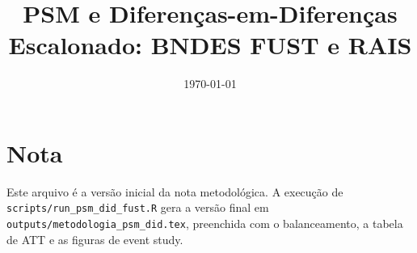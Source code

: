 \documentclass[12pt]{article}
\title{PSM e Diferenças-em-Diferenças Escalonado: BNDES FUST e RAIS}
\author{}
\date{\today}
\begin{document}
\maketitle

\section{Nota}

Este arquivo é a versão inicial da nota metodológica. A execução de
\texttt{scripts/run\_psm\_did\_fust.R} gera a versão final em
\texttt{outputs/metodologia\_psm\_did.tex}, preenchida com o balanceamento,
a tabela de ATT e as figuras de event study.
\end{document}

